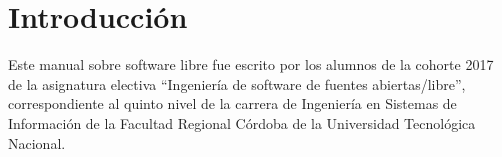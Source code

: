 \chapter{Introducción}

Este manual sobre software libre fue escrito por los alumnos de la cohorte 2017 de la asignatura electiva ``Ingeniería de software de fuentes abiertas/libre'', correspondiente al quinto nivel de la carrera de Ingeniería en Sistemas de Información de la Facultad Regional Córdoba de la Universidad Tecnológica Nacional.

